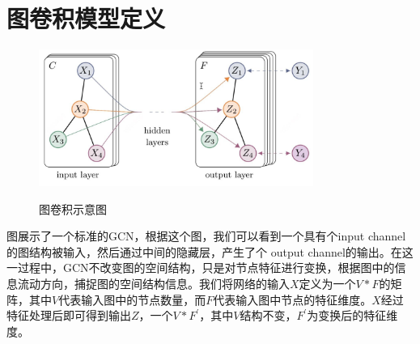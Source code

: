 \section{图卷积模型定义} \label{gcn_model_define}
\begin{figure}[ht]
    \centering
    \includegraphics[width=0.80\textwidth]{FigMa/GCN-SEMI.png}\\
    \vspace{-0.3cm}
    \caption{图卷积示意图\cite{kipf2016semi}}
    \label{fig:GCN-SEMI}
\end{figure}
图\parencite{kipf2016semi}展示了一个标准的GCN，根据这个图，我们可以看到一个具有个input channel的图结构被输入，然后通过中间的隐藏层，产生了个 output channel的输出。在这一过程中，GCN不改变图的空间结构，只是对节点特征进行变换，根据图中的信息流动方向，捕捉图的空间结构信息。我们将网络的输入$X$定义为一个$V*F$的矩阵，其中$V$代表输入图中的节点数量，而$F$代表输入图中节点的特征维度。$X$经过特征处理后即可得到输出$Z$，一个$V*F^{\prime}$，其中$V$结构不变，$F^{\prime}$为变换后的特征维度。

